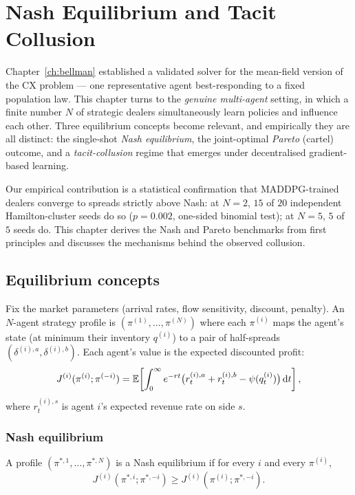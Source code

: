 \chapter{Nash Equilibrium and Tacit Collusion}
\label{ch:nash}

Chapter~\ref{ch:bellman} established a validated solver for the mean-field version of the CX problem --- one representative agent best-responding to a fixed population law. This chapter turns to the \emph{genuine multi-agent} setting, in which a finite number $N$ of strategic dealers simultaneously learn policies and influence each other. Three equilibrium concepts become relevant, and empirically they are all distinct: the single-shot \emph{Nash equilibrium}, the joint-optimal \emph{Pareto} (cartel) outcome, and a \emph{tacit-collusion} regime that emerges under decentralised gradient-based learning.

Our empirical contribution is a statistical confirmation that MADDPG-trained dealers converge to spreads strictly above Nash: at $N = 2$, $15$ of $20$ independent Hamilton-cluster seeds do so ($p = 0.002$, one-sided binomial test); at $N = 5$, $5$ of $5$ seeds do. This chapter derives the Nash and Pareto benchmarks from first principles and discusses the mechanisms behind the observed collusion.

\section{Equilibrium concepts}
\label{sec:eqm-concepts}

Fix the market parameters (arrival rates, flow sensitivity, discount, penalty). An $N$-agent strategy profile is $(\pi^{(1)}, \ldots, \pi^{(N)})$ where each $\pi^{(i)}$ maps the agent's state (at minimum their inventory $q^{(i)}$) to a pair of half-spreads $(\delta^{(i), a}, \delta^{(i), b})$. Each agent's value is the expected discounted profit:
\begin{equation}
  J^{(i)}(\pi^{(i)}; \pi^{(-i)}) = \mathbb{E}\!\left[\int_0^\infty e^{-r t} \bigl(r^{(i), a}_t + r^{(i), b}_t - \psi(q^{(i)}_t)\bigr) \, \mathrm{d} t\right],
\end{equation}
where $r^{(i), s}_t$ is agent $i$'s expected revenue rate on side $s$.

\subsection{Nash equilibrium}

\begin{definition}
\label{def:nash}
A profile $(\pi^{*, 1}, \ldots, \pi^{*, N})$ is a Nash equilibrium if for every $i$ and every $\pi^{(i)}$,
\begin{equation}
  J^{(i)}(\pi^{*, i}; \pi^{*, -i}) \geq J^{(i)}(\pi^{(i)}; \pi^{*, -i}).
\end{equation}
\end{definition}


